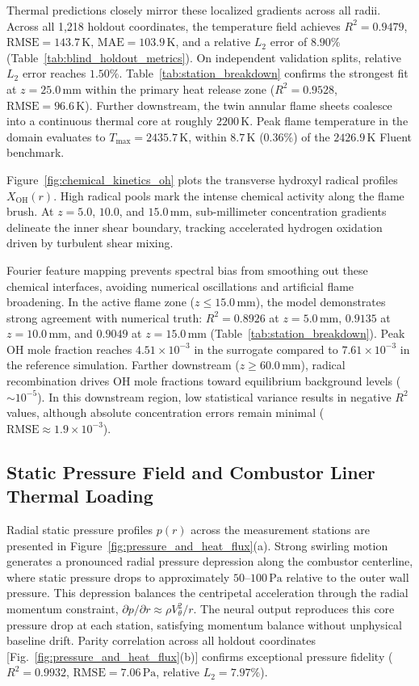 \documentclass[reprint,aps,prfluids,superscriptaddress,twocolumn,floatfix]{revtex4-2}
\begin{document}
Thermal predictions closely mirror these localized gradients across all radii. Across all 1,218 holdout coordinates, the temperature field achieves $R^2 = 0.9479$, $\text{RMSE} = 143.7\,\text{K}$, $\text{MAE} = 103.9\,\text{K}$, and a relative $L_2$ error of $8.90\%$ (Table~\ref{tab:blind_holdout_metrics}). On independent validation splits, relative $L_2$ error reaches $1.50\%$. Table~\ref{tab:station_breakdown} confirms the strongest fit at $z = 25.0\,\text{mm}$ within the primary heat release zone ($R^2 = 0.9528$, $\text{RMSE} = 96.6\,\text{K}$). Further downstream, the twin annular flame sheets coalesce into a continuous thermal core at roughly $2200\,\text{K}$. Peak flame temperature in the domain evaluates to $T_{\text{max}} = 2435.7\,\text{K}$, within $8.7\,\text{K}$ ($0.36\%$) of the $2426.9\,\text{K}$ Fluent benchmark.

Figure~\ref{fig:chemical_kinetics_oh} plots the transverse hydroxyl radical profiles $X_{\text{OH}}(r)$. High radical pools mark the intense chemical activity along the flame brush. At $z = 5.0$, $10.0$, and $15.0\,\text{mm}$, sub-millimeter concentration gradients delineate the inner shear boundary, tracking accelerated hydrogen oxidation driven by turbulent shear mixing.

Fourier feature mapping prevents spectral bias from smoothing out these chemical interfaces, avoiding numerical oscillations and artificial flame broadening. In the active flame zone ($z \le 15.0\,\text{mm}$), the model demonstrates strong agreement with numerical truth: $R^2 = 0.8926$ at $z = 5.0\,\text{mm}$, $0.9135$ at $z = 10.0\,\text{mm}$, and $0.9049$ at $z = 15.0\,\text{mm}$ (Table~\ref{tab:station_breakdown}). Peak OH mole fraction reaches $4.51 \times 10^{-3}$ in the surrogate compared to $7.61 \times 10^{-3}$ in the reference simulation. Farther downstream ($z \ge 60.0\,\text{mm}$), radical recombination drives OH mole fractions toward equilibrium background levels ($\sim 10^{-5}$). In this downstream region, low statistical variance results in negative $R^2$ values, although absolute concentration errors remain minimal ($\text{RMSE} \approx 1.9 \times 10^{-3}$).

\subsection{Static Pressure Field and Combustor Liner Thermal Loading}

Radial static pressure profiles $p(r)$ across the measurement stations are presented in Figure~\ref{fig:pressure_and_heat_flux}(a). Strong swirling motion generates a pronounced radial pressure depression along the combustor centerline, where static pressure drops to approximately $50\text{--}100\,\text{Pa}$ relative to the outer wall pressure. This depression balances the centripetal acceleration through the radial momentum constraint, $\partial p / \partial r \approx \rho V_\theta^2 / r$. The neural output reproduces this core pressure drop at each station, satisfying momentum balance without unphysical baseline drift. Parity correlation across all holdout coordinates [Fig.~\ref{fig:pressure_and_heat_flux}(b)] confirms exceptional pressure fidelity ($R^2 = 0.9932$, $\text{RMSE} = 7.06\,\text{Pa}$, relative $L_2 = 7.97\%$).
\end{document}
